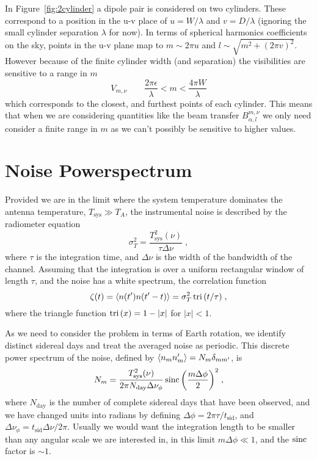 \documentclass[onecolumn]{revtex4}
\begin{document}
In Figure~\ref{fig:2cylinder} a dipole pair is considered on two
cylinders. These correspond to a position in the u-v place of $u = W / \lambda$
and $v = D / \lambda$ (ignoring the small cylinder separation $\lambda$ for
now). In terms of spherical harmonics coefficients on the sky, points in the u-v
plane map to $m \sim 2\pi u$ and $l \sim \sqrt{m^2 + (2\pi v)^2}$. However
because of the finite cylinder width (and separation) the visibilities are
sensitive to a range in $m$
\begin{equation}
  V_{m,\nu} \qquad \frac{2 \pi \epsilon}{\lambda} < m < \frac{4 \pi
    W}{\lambda}
\end{equation}
which corresponds to the closest, and furthest points of each cylinder. This
means that when we are considering quantities like the beam transfer
$B_{\alpha,l}^{m,\nu}$ we only need consider a finite range in $m$ as we can't
possibly be sensitive to higher values.

\appendix


\section{Noise Powerspectrum}

Provided we are in the limit where the system temperature dominates the antenna
temperature, $T_\text{sys} \gg T_A$, the instrumental noise is described by the
radiometer equation
\begin{equation}
\sigma_T^2 = \frac{T_\text{sys}^2(\nu)}{\tau \Delta\nu} \; ,
\end{equation}
where $\tau$ is the integration time, and $\Delta\nu$ is the width of the
bandwidth of the channel. Assuming that the integration is over a uniform
rectangular window of length $\tau$, and the noise has a white spectrum, the
correlation function
\begin{equation}
\zeta(t) = \left\langle n(t') n(t' - t) \right\rangle = \sigma_T^2 \operatorname{tri}{(t / \tau)} \; ,
\end{equation}
where the triangle function $\operatorname{tri}{(x)} = 1 - \left\lvert x \right\rvert$ for
$\left\lvert x \right\rvert < 1$.

As we need to consider the problem in terms of Earth rotation, we identify
distinct sidereal days and treat the averaged noise as periodic. This discrete
power spectrum of the noise, defined by $\left\langle n_m n_m' \right\rangle = N_m \delta_{m m'}$,
is
\begin{equation}
N_m = \frac{T_\text{sys}^2(\nu)}{2 \pi N_\text{day} \Delta\nu_\phi} \operatorname{sinc}{\left(\frac{m
      \Delta\phi}{2}\right)}^2 \; ,
\end{equation}
where $N_\text{day}$ is the number of complete sidereal days that have been
observed, and we have changed units into radians by defining $\Delta\phi = 2\pi
\tau / t_\text{sid}$, and $\Delta\nu_\phi = t_\text{sid} \Delta\nu / 2\pi$.
Usually we would want the integration length to be smaller than any angular
scale we are interested in, in this limit $m \Delta\phi \ll 1$, and the $\operatorname{sinc}$
factor is $\sim 1$.
\end{document}
